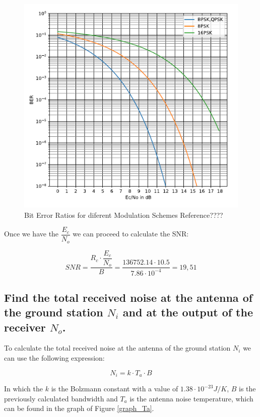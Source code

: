 \documentclass[a4paper,12pt,calibri,oneside,openany]{book}
\theoremstyle{break}
\begin{document}
		\begin{figure}[h]
			\includegraphics[width=14cm]{graph_BER}
			\caption{Bit Error Ratios for diferent Modulation Schemes Reference????}
			\label{graf_BER}
		\end{figure}
	
		Once we have the $\dfrac{E_{c}}{N_{o}}$ we can proceed to calculate the SNR:
		
		\begin{equation} \label{eq_snr}
			SNR = \dfrac{R_{c} \cdot \dfrac{E_{c}} {N_{o}}}{B} = \dfrac{136752.14 \cdot 10.5} {7.86 \cdot 10^{-4}} = 19,51
		\end{equation}
		
	\subsection{Find the total received noise at the antenna of the ground station $N_{i}$ and at the output of the receiver $N_{o}$.}	
		
		 To calculate the total received noise at the antenna of the ground station $N_{i}$ we can use the following expression: 
		 
		 \begin{equation} \label{eq_ni}
		 	N_{i} = k \cdot T_{a} \cdot B
		 \end{equation}
	
		In which the $k$ is the Bolzmann constant with a value of $ 1.38 \cdot 10^{-23} \unit{J/K}$, $B$ is the previously calculated bandwidth and $T_{a}$ is the antenna noise temperature, which can be found in the graph of Figure \ref{graph_Ta}.
		
\end{document}
